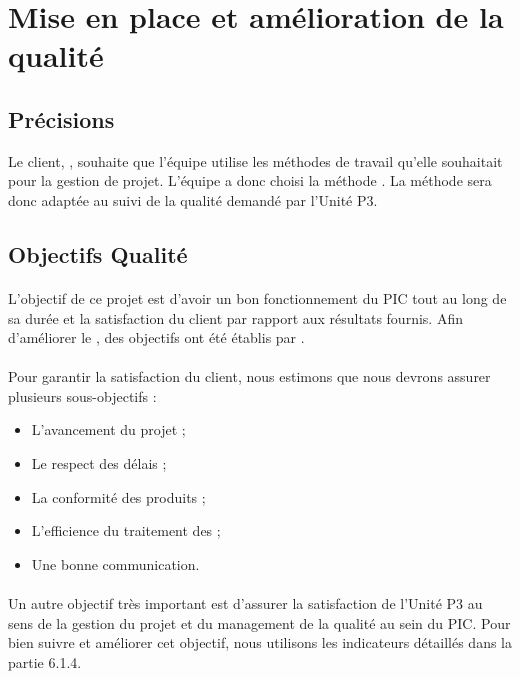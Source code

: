 \section{Mise en place et amélioration de la qualité}

\subsection{Précisions}
Le client, \nomClient , souhaite que l’équipe \nomEquipe utilise les méthodes de travail qu'elle souhaitait pour
la gestion de projet. L'équipe a donc choisi la méthode \agile. La méthode \agile sera donc adaptée au suivi de la qualité demandé par l’Unité P3.

\subsection{Objectifs Qualité}
\paragraph*{} L’objectif de ce projet est d’avoir un bon fonctionnement du PIC tout au long de sa durée et la satisfaction du client par rapport aux résultats fournis. Afin d’améliorer le \SMQ , des objectifs ont été établis par \nomEquipe .
\paragraph*{} Pour garantir la satisfaction du client, nous estimons que nous devrons assurer plusieurs
sous-objectifs :
\begin{itemize} 
          \item L’avancement du projet ;
          \item Le respect des délais ;
          \item La conformité des produits ;
	\item L’efficience du traitement des \FT ;
	\item Une bonne communication.
	
 \end{itemize}
\paragraph*{} Un autre objectif très important est d’assurer la satisfaction de l’Unité P3 au sens de
la gestion du projet et du management de la qualité au sein du PIC. Pour bien suivre et
améliorer cet objectif, nous utilisons les indicateurs détaillés dans la partie 6.1.4.


